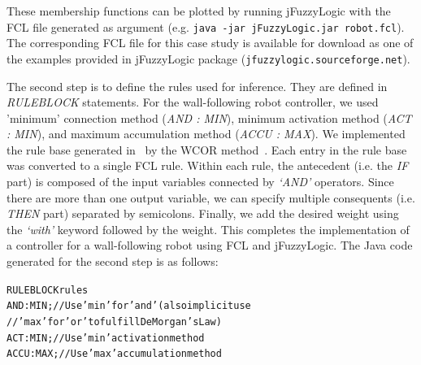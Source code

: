 \documentclass[11pt,twoside]{article}
\begin{document}
\begin{multicols}{2}
\vspace*{10pt}
These membership functions can be plotted by running jFuzzyLogic with the FCL file generated as argument (e.g. \texttt{java -jar jFuzzyLogic.jar robot.fcl}). 
The corresponding FCL file for this case study is available for download as one of the examples provided in jFuzzyLogic package (\texttt{jfuzzylogic.sourceforge.net}).

The second step is to define the rules used for inference. 
They are defined in \textit{RULEBLOCK} statements. 
For the wall-following robot controller, we used 'minimum' connection method (\textit{AND : MIN}), minimum activation method (\textit{ACT : MIN}), and maximum accumulation method (\textit{ACCU : MAX}). 
We implemented the rule base generated in~\cite{mucientes2009learning} by the WCOR method~\cite{Alc06}. 
Each entry in the rule base was converted to a single FCL rule. 
Within each rule, the antecedent (i.e. the \textit{IF} part) is composed of the input variables connected by \textit{`AND'} operators. 
Since there are more than one output variable, we can specify multiple consequents (i.e. \textit{THEN} part) separated by semicolons. 
Finally, we add the desired weight using the \textit{`with'} keyword followed by the weight. 
This completes the implementation of a controller for a wall-following robot using FCL and jFuzzyLogic. 
The Java code generated for the second step is as follows:

\vspace*{10pt}
\begin{scriptsize}
\begin{alltt}
RULEBLOCK rules
AND  : MIN;			// Use 'min' for 'and' (also implicit use 
            //'max' for 'or' to fulfill DeMorgan's Law)
ACT  : MIN;			// Use 'min' activation method
ACCU : MAX;			// Use 'max' accumulation method


\end{alltt}
\end{scriptsize}
\end{multicols}
\end{document}
